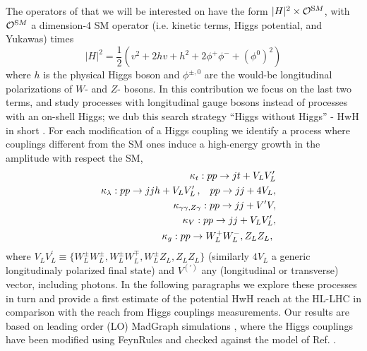 The operators of that we will be interested on have the form $|H|^2\times \mathcal{O}^{\mathrm SM}$, with $\mathcal{O}^{\mathrm SM}$ a dimension-4  SM operator (i.e. kinetic terms, Higgs potential, and Yukawas) times
\begin{equation}
|H|^2=\frac{1}{2}\left(v^2+ 2 hv + h^2+2\phi^+\phi^-+(\phi^0)^2\right)
\end{equation}
where $h$ is the physical Higgs boson and $\phi^{\pm,0}$ are the would-be longitudinal polarizations of $W$- and $Z$- bosons.
In this contribution we focus on the last two terms, and study processes with longitudinal gauge bosons instead of processes with an on-shell Higgs; we dub this search strategy ``Higgs without Higgs''  - HwH in short \cite{Henning:2018kys}.  
%
For each modification of a Higgs coupling we identify a process where couplings different from the SM ones induce a high-energy growth in the amplitude with respect the SM,
\begin{eqnarray}
&&\kappa_t: p p \to j t+ V_LV^\prime_L\label{prockt}\\
&&\kappa_\lambda:  p p \to  j j h + V_LV^\prime_L\,,\hspace{.3cm}p p \to jj+4V_L, \label{prockh36}\\
 &&\kappa_{\gamma\gamma,Z\gamma}:  p p \to j j +V^\prime V,\label{prockga} \\ 
&&\kappa_V:  p p \to jj+V_LV^\prime_L,\label{prockv}\\
&&\kappa_g:  p p \to W_L^+W_L^-, Z_LZ_L ,\ \label{prockg}
\end{eqnarray} 
where $V_LV^\prime_L\equiv\{W_L^\pm W_L^\pm,W_L^\pm W_L^\mp,W_L^\pm Z_L,Z_LZ_L\}$ (similarly $4V_L$ a generic longitudinaly polarized final state) and $V^{(\prime)}$ any (longitudinal or transverse) vector, including photons.
In the following paragraphs we explore these processes in turn and provide a first estimate of the potential HwH reach at the HL-LHC in comparison with the reach from Higgs couplings measurements. 
Our results are based on leading order (LO) MadGraph simulations \cite{Alwall:2014hca}, where the Higgs couplings have been modified using FeynRules \cite{Christensen:2008py} and checked against the model of Ref. \cite{Falkowski:2015wza}.

 


